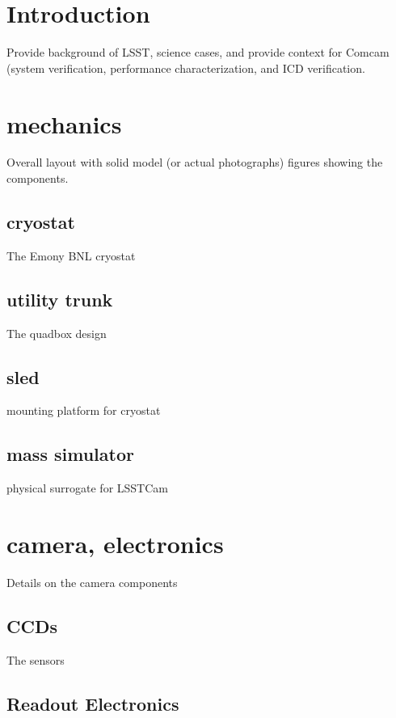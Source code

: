 \section{Introduction}

Provide background of LSST, science cases, and provide context for Comcam (system verification, performance characterization, and ICD verification.

\section{mechanics}

Overall layout with solid model (or actual photographs) figures showing the components.

\subsection{cryostat}

The Emony BNL cryostat

\subsection{utility trunk}

The quadbox design

\subsection{sled}

mounting platform for cryostat

\subsection{mass simulator}

physical surrogate for LSSTCam

\section{camera, electronics}

Details on the camera components

\subsection{CCDs}

The sensors

\subsection{Readout Electronics}

